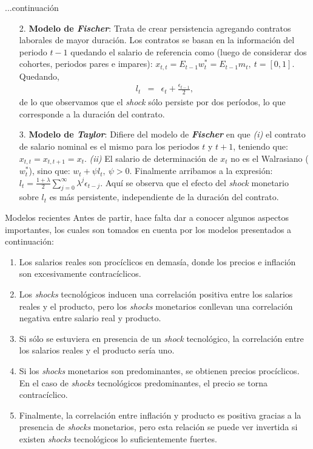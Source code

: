 \documentclass{beamer}
\begin{document}
\begin{frame}{...continuaci\'on}
\begin{enumerate}
\item[2.]{\textbf{Modelo de \emph{Fischer}}: Trata de crear persistencia agregando contratos laborales de mayor duraci\'on. Los contratos se basan en la informaci\'on del periodo $t-1$ quedando el salario de referencia como (luego de considerar dos cohortes, periodos pares e impares): $x_{t,t}=E_{t-1}w^{*}_{t}=E_{t-1}m_{t},\ t=[0,1]$. Quedando,}
\begin{eqnarray*}
l_{t} & = & \epsilon_{t}+\frac{\epsilon_{t-1}}{2},
\end{eqnarray*}
de lo que observamos que el \emph{shock} s\'olo persiste por dos per\'iodos, lo que corresponde a la duraci\'on del contrato.
\item[3.]{\textbf{Modelo de \emph{Taylor}}: Difiere del modelo de \emph{\textbf{Fischer}} en que \emph{(i)} el contrato de salario nominal es el mismo para los periodos $t$ y $t+1$, teniendo que: $x_{t,t}=x_{t,t+1}=x_{t}$. \emph{(ii)} El salario de determinaci\'on de $x_{t}$ no es el Walrasiano ($w_{t}^{*}$), sino que: $w_{t}+\psi l_{t},\ \psi>0$. Finalmente arribamos a la expresi\'on: $l_{t}=\frac{1+\lambda}{2}\sum_{j=0}^{\infty}\lambda^{j}\epsilon_{t-j}$. Aqu\'i se observa que el efecto del \emph{shock} monetario sobre $l_{t}$ es m\'as persistente, independiente de la duraci\'on del contrato.}
\end{enumerate}
\end{frame}


\begin{frame}{Modelos recientes}
Antes de partir, hace falta dar a conocer algunos aspectos importantes, los cuales son tomados en cuenta por los modelos presentados a continuaci\'on:
\begin{enumerate}
\item{Los salarios reales son proc\'iclicos en demas\'ia, donde los precios e inflaci\'on son excesivamente contrac\'iclicos.}
\item{Los \emph{shocks} tecnol\'ogicos inducen una correlaci\'on positiva entre los salarios reales y el producto, pero los \emph{shocks} monetarios conllevan una correlaci\'on negativa entre salario real y producto.}
\item{Si s\'olo se estuviera en presencia de un \emph{shock} tecnol\'ogico, la correlaci\'on entre los salarios reales y el producto ser\'ia uno.}
\item{Si los \emph{shocks} monetarios son predominantes, se obtienen precios proc\'iclicos. En el caso de \emph{shocks} tecnol\'ogicos predominantes, el precio se torna contrac\'iclico.}
\item{Finalmente, la correlaci\'on entre inflaci\'on y producto es positiva gracias a la presencia de \emph{shocks} monetarios, pero esta relaci\'on se puede ver invertida si existen \emph{shocks} tecnol\'ogicos lo suficientemente fuertes.}
\end{enumerate}
\end{frame}
\end{document}
